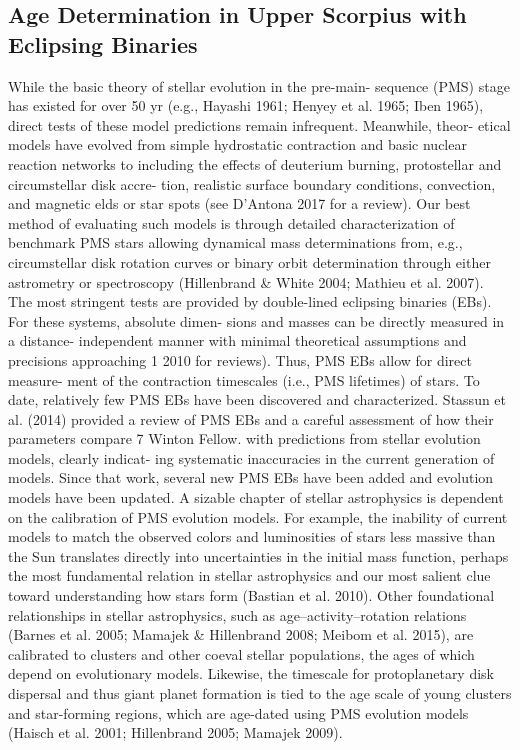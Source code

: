\documentclass[../Main.tex]{subfiles}
\begin{document}
{\subsection{Age Determination in Upper Scorpius with Eclipsing Binaries}

While the basic theory of stellar evolution in the pre-main-
sequence (PMS) stage has existed for over 50 yr (e.g.,
Hayashi 1961; Henyey et al. 1965; Iben 1965), direct tests of
these model predictions remain infrequent. Meanwhile, theor-
etical models have evolved from simple hydrostatic contraction
and basic nuclear reaction networks to including the effects of
deuterium burning, protostellar and circumstellar disk accre-
tion, realistic surface boundary conditions, convection, and
magnetic elds or star spots (see D’Antona 2017 for a review).
Our best method of evaluating such models is through detailed
characterization of benchmark PMS stars allowing dynamical
mass determinations from, e.g., circumstellar disk rotation
curves or binary orbit determination through either astrometry
or spectroscopy (Hillenbrand & White 2004; Mathieu et al.
2007). The most stringent tests are provided by double-lined
eclipsing binaries (EBs). For these systems, absolute dimen-
sions and masses can be directly measured in a distance-
independent manner with minimal theoretical assumptions and
precisions approaching 1%
2010 for reviews). Thus, PMS EBs allow for direct measure-
ment of the contraction timescales (i.e., PMS lifetimes) of stars.
To date, relatively few PMS EBs have been discovered and
characterized. Stassun et al. (2014) provided a review of PMS
EBs and a careful assessment of how their parameters compare
7 Winton Fellow.
with predictions from stellar evolution models, clearly indicat-
ing systematic inaccuracies in the current generation of models.
Since that work, several new PMS EBs have been added and
evolution models have been updated.
A sizable chapter of stellar astrophysics is dependent on the
calibration of PMS evolution models. For example, the
inability of current models to match the observed colors and
luminosities of stars less massive than the Sun translates
directly into uncertainties in the initial mass function, perhaps
the most fundamental relation in stellar astrophysics and our
most salient clue toward understanding how stars form (Bastian
et al. 2010). Other foundational relationships in stellar
astrophysics, such as age–activity–rotation relations (Barnes
et al. 2005; Mamajek & Hillenbrand 2008; Meibom et al.
2015), are calibrated to clusters and other coeval stellar
populations, the ages of which depend on evolutionary models.
Likewise, the timescale for protoplanetary disk dispersal and
thus giant planet formation is tied to the age scale of young
clusters and star-forming regions, which are age-dated using
PMS evolution models (Haisch et al. 2001; Hillenbrand 2005;
Mamajek 2009).

}
\end{document}
